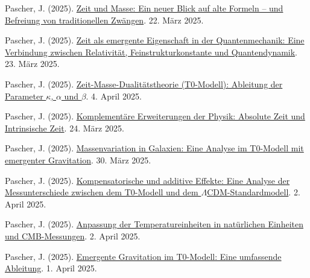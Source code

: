 \documentclass[12pt,a4paper]{article}
\begin{document}
	\begin{thebibliography}{99}
		 Pascher, J. (2025). \href{https://github.com/jpascher/T0-Time-Mass-Duality/tree/main/2/pdf/Deutsch/ZeitMasseNeuerBlick.pdf}{Zeit und Masse: Ein neuer Blick auf alte Formeln – und Befreiung von traditionellen Zwängen}. 22. März 2025.
		
		 Pascher, J. (2025). \href{https://github.com/jpascher/T0-Time-Mass-Duality/tree/main/2/pdf/Deutsch/ZeitEmergentQM.pdf}{Zeit als emergente Eigenschaft in der Quantenmechanik: Eine Verbindung zwischen Relativität, Feinstrukturkonstante und Quantendynamik}. 23. März 2025.
		
		 Pascher, J. (2025). \href{https://github.com/jpascher/T0-Time-Mass-Duality/tree/main/2/pdf/Deutsch/ZeitMasseT0Params.pdf}{Zeit-Masse-Dualitätstheorie (T0-Modell): Ableitung der Parameter $\kappa$, $\alpha$ und $\beta$}. 4. April 2025.
		
		 Pascher, J. (2025). \href{https://github.com/jpascher/T0-Time-Mass-Duality/tree/main/2/pdf/Deutsch/KomplementPhysikZeit.pdf}{Komplementäre Erweiterungen der Physik: Absolute Zeit und Intrinsische Zeit}. 24. März 2025.
		
		 Pascher, J. (2025). \href{https://github.com/jpascher/T0-Time-Mass-Duality/tree/main/2/pdf/Deutsch/MassVarGalaxien.pdf}{Massenvariation in Galaxien: Eine Analyse im T0-Modell mit emergenter Gravitation}. 30. März 2025.
		
		 Pascher, J. (2025). \href{https://github.com/jpascher/T0-Time-Mass-Duality/tree/main/2/pdf/Deutsch/MessdifferenzenT0Standard.pdf}{Kompensatorische und additive Effekte: Eine Analyse der Messunterschiede zwischen dem T0-Modell und dem $\Lambda$CDM-Standardmodell}. 2. April 2025.
		
		 Pascher, J. (2025). \href{https://github.com/jpascher/T0-Time-Mass-Duality/tree/main/2/pdf/Deutsch/TempEinheitenCMB.pdf}{Anpassung der Temperatureinheiten in natürlichen Einheiten und CMB-Messungen}. 2. April 2025.
		
		 Pascher, J. (2025). \href{https://github.com/jpascher/T0-Time-Mass-Duality/tree/main/2/pdf/Deutsch/EmergentGravT0.pdf}{Emergente Gravitation im T0-Modell: Eine umfassende Ableitung}. 1. April 2025.
		

\end{thebibliography}
\end{document}
